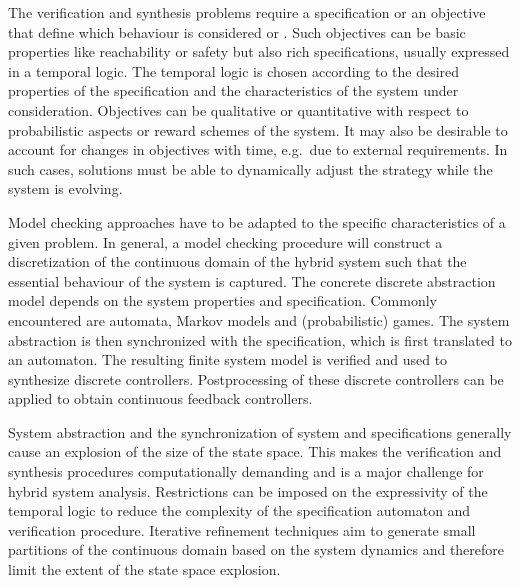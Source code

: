 The verification and synthesis problems require a specification or an objective that define which behaviour is considered  or .
Such objectives can be basic properties like reachability or safety but also rich specifications, usually expressed in a temporal logic.
The temporal logic is chosen according to the desired properties of the specification and the characteristics of the system under consideration.
Objectives can be qualitative or quantitative with respect to probabilistic aspects or reward schemes of the system.
It may also be desirable to account for changes in objectives with time, e.g.\ due to external requirements.
In such cases, solutions must be able to dynamically adjust the strategy while the system is evolving.

Model checking approaches have to be adapted to the specific characteristics of a given problem.
In general, a model checking procedure will construct a discretization of the continuous domain of the hybrid system such that the essential behaviour of the system is captured.
The concrete discrete abstraction model depends on the system properties and specification.
Commonly encountered are automata, Markov models and (probabilistic) games.
The system abstraction is then synchronized with the specification, which is first translated to an automaton.
The resulting finite system model is verified and used to synthesize discrete controllers.
Postprocessing of these discrete controllers can be applied to obtain continuous feedback controllers.

System abstraction and the synchronization of system and specifications generally cause an explosion of the size of the state space.
This makes the verification and synthesis procedures computationally demanding and is a major challenge for hybrid system analysis.
Restrictions can be imposed on the expressivity of the temporal logic to reduce the complexity of the specification automaton and verification procedure.
Iterative refinement techniques aim to generate small partitions of the continuous domain based on the system dynamics and therefore limit the extent of the state space explosion.

